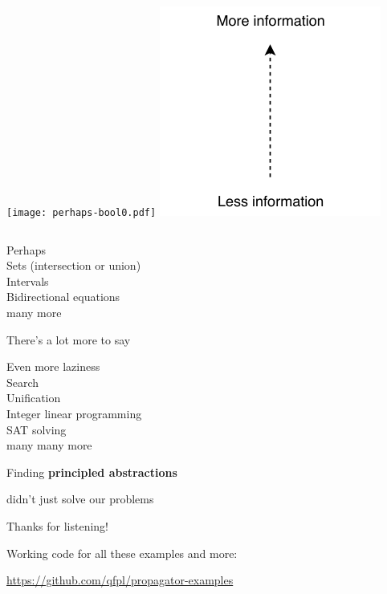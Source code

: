 \documentclass[UKenglish,usenames,dvipsnames,svgnames,table,aspectratio=169,mathserif]{beamer}
\newcommand{\nl}{\vspace{\baselineskip}}
\begin{document}
\begin{frame}
\begin{columns}
\texttt{[image: perhaps-bool0.pdf]}
\includegraphics[scale=1.3]{set/more-info.pdf}
\end{columns}
\end{frame}


\begin{frame}

\centering
\Large
Perhaps \\
Sets (intersection or union) \\
Intervals \\
Bidirectional equations \\
many more
\end{frame}


\begin{frame}

\centering \LARGE
There's a lot more to say
\end{frame}


\begin{frame}

\centering
\Large
Even more laziness \\
Search \\
Unification \\
Integer linear programming \\
SAT solving \\
many many more
\end{frame}


\begin{frame}
\centering \LARGE

Finding {\bf principled abstractions}

didn't just solve our problems
\end{frame}


\begin{frame}
\huge \centering
Thanks for listening!
\nl

\large
Working code for all these examples and more:

\url{https://github.com/qfpl/propagator-examples}

\end{frame}
\end{document}
